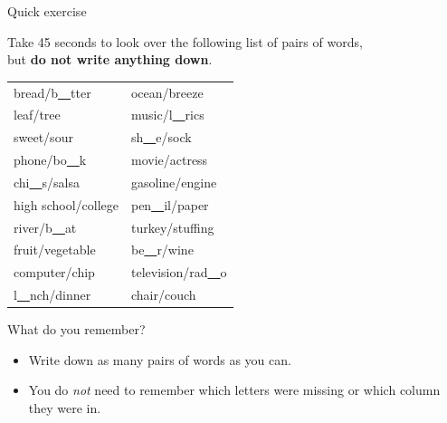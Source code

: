 \documentclass[14pt]{beamer}
\newcommand{\p}{\pause}
\newcommand{\setsize}[1]{\fontsize{#1}{#1}\selectfont} %
\newcommand{\smallerfont}{\setsize{13}} %
\begin{document}
\begin{frame}{Quick exercise}
\smallerfont
 \p

Take 45 seconds to look over the following list of pairs of words, \\ but {\bf do not write anything down}.

\p

\begin{table}[h]
\centering
\begin{tabular}{@{}ll@{}}
\toprule
bread/b\underline{\ \ }tter & ocean/breeze \\
leaf/tree & music/l\underline{\ \ }rics\\
sweet/sour & sh\underline{\ \ }e/sock\\
phone/bo\underline{\ \ }k & movie/actress \\
chi\underline{\ \ }s/salsa & gasoline/engine \\
high school/college & pen\underline{\ \ }il/paper\\
river/b\underline{\ \ }at & turkey/stuffing \\
fruit/vegetable & be\underline{\ \ }r/wine\\
computer/chip & television/rad\underline{\ \ }o\\
l\underline{\ \ }nch/dinner & chair/couch \\
\bottomrule
\end{tabular}
\end{table}

\end{frame}
\begin{frame}{What do you remember?}

\p

\begin{itemize}
	\item[] Write down as many pairs of words as you can.
	\item[] You do \emph{not} need to remember which letters were missing or which
		column they were in.
\end{itemize}

\end{frame}
\end{document}
